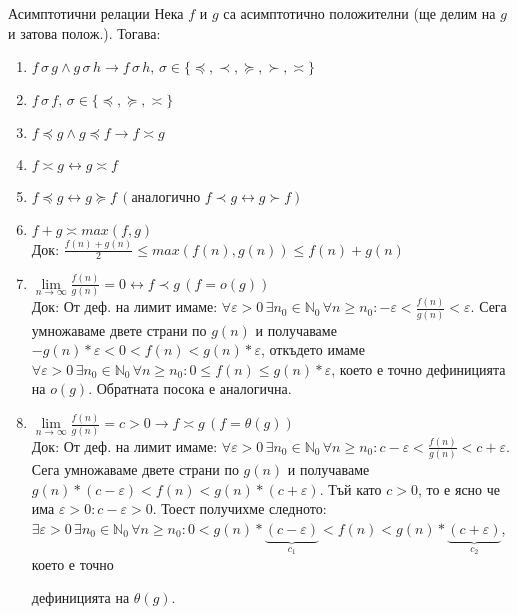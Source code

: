\begin{boxmainproperties}{Асимптотични релации}{}\label{mprop-1}
Нека $f$ и $g$ са асимптотично положителни (ще делим на $g$ и затова полож.). Тогава:
	\begin{enumerate}
		\item $f\,\sigma\,g\land g\,\sigma\,h\rightarrow f\,\sigma\,h,\,\sigma\in\{\preccurlyeq,\prec,\succcurlyeq,\succ,\asymp\}$
		\item $f\,\sigma\,f,\,\sigma\in\{\preccurlyeq,\succcurlyeq,\asymp\}$
		\item $f\preccurlyeq g\land g\preccurlyeq f\rightarrow f\asymp g$
		\item $f\asymp g\leftrightarrow g\asymp f$
		\item $f\preccurlyeq g\leftrightarrow g\succcurlyeq f\,(\text{аналогично }f\prec g\leftrightarrow g\succ f)$
		\item $f+g\asymp max(f,g)$\\
			  $\textbf{Док: }\frac{f(n)+g(n)}2\le max(f(n),g(n))\le f(n)+g(n)$
		\item $\lim\limits_{n\to\infty}\frac{f(n)}{g(n)}=0\leftrightarrow f\prec g\,(f=o(g))$\\
			  $\textbf{Док:}$ От деф. на лимит имаме: $\forall\varepsilon>0\,\exists n_0\in\mathbb{N}_0\,\forall n\ge n_0:-\varepsilon<\frac{f(n)}{g(n)}<\varepsilon$. Сега умножаваме двете страни по $g(n)$ и получаваме $-g(n)*\varepsilon<0<f(n)<g(n)*\varepsilon$, откъдето имаме $\forall\varepsilon>0\,\exists n_0\in\mathbb{N}_0\,\forall n\ge n_0:0\le f(n)\le g(n)*\varepsilon$, което е точно дефиницията на $\hyperref[bdef-asymp-classes]{o(g)}$. Обратната посока е аналогична.
		\item $\lim\limits_{n\to\infty}\frac{f(n)}{g(n)}=c>0\rightarrow f\asymp g\,(f=\theta(g))$\\
			  $\textbf{Док:}$ От деф. на лимит имаме: $\forall\varepsilon>0\,\exists n_0\in\mathbb{N}_0\,\forall n\ge n_0:c-\varepsilon<\frac{f(n)}{g(n)}<c+\varepsilon$. Сега умножаваме двете страни по $g(n)$ и получаваме $g(n)*(c-\varepsilon)<f(n)<g(n)*(c+\varepsilon)$. Тъй като $c>0$, то е ясно че има $\varepsilon>0:c-\varepsilon>0$. Тоест получихме следното: $\exists\varepsilon>0\,\exists n_0\in\mathbb{N}_0\,\forall n\ge n_0:0<g(n)*\underbrace{(c-\varepsilon)}_{c_1}<f(n)<g(n)*\underbrace{(c+\varepsilon)}_{c_2}$, което е точно 
			  \vspace{-0.72cm}%
			  
			  дефиницията на $\hyperref[bdef-asymp-classes]{\theta(g)}$.
			  \vspace{-0.15cm}
			  

\end{enumerate}
\end{boxmainproperties}
